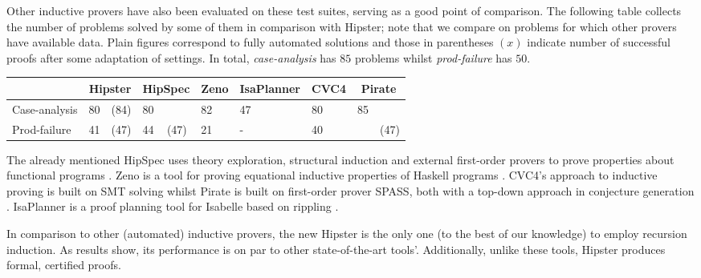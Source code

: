 
Other inductive provers have also been evaluated on these test suites, serving as a good point of comparison.
%
The following table collects the number of problems solved by some of them in comparison with Hipster; note that we compare on problems for which other provers have available data.
%
Plain figures correspond to fully automated solutions and those in parentheses $(x)$ indicate number of successful proofs after some adaptation of settings.
%
In total, \emph{case-analysis} has $85$ problems whilst \emph{prod-failure} has $50$.
%

\vspace{2 mm}

\noindent \begin{tabularx}{\textwidth}{l | X X | X X | X | X | X | X X}
  & \multicolumn{2}{|c|}{Hipster}
  	& \multicolumn{2}{c|}{HipSpec}
  	& \multicolumn{1}{c|}{Zeno}
  	& \multicolumn{1}{c|}{IsaPlanner}
  	& \multicolumn{1}{c|}{CVC4}
  	& \multicolumn{2}{c}{Pirate} \\
  \hline
  Case-analysis & 80 & (84) & 80 & & 82 & 47 & 80 & 85 & \\
  Prod-failure & 41 & (47) & 44 & (47) & 21 & - & 40 & & (47) \\
\end{tabularx}

\vspace{2 mm}

\noindent The already mentioned HipSpec uses theory exploration, structural induction and external first-order provers to prove properties about functional programs \cite{hipspecCADE}.
%
Zeno is a tool for proving equational inductive properties of Haskell programs \cite{zeno}.
%
CVC4's approach to inductive proving is built on SMT solving whilst Pirate is built on first-order prover SPASS, both with a top-down approach in conjecture generation \cite{cvc4, SPASSInduction}.
%
IsaPlanner is a proof planning tool for Isabelle based on rippling \cite{isaplanner2, IsaPcase}.

In comparison to other (automated) inductive provers, the new Hipster is the only one (to the best of our knowledge) to employ recursion induction.
%
As results show, its performance is on par to other state-of-the-art tools'.
%
Additionally, unlike these tools, Hipster produces formal, certified proofs.

